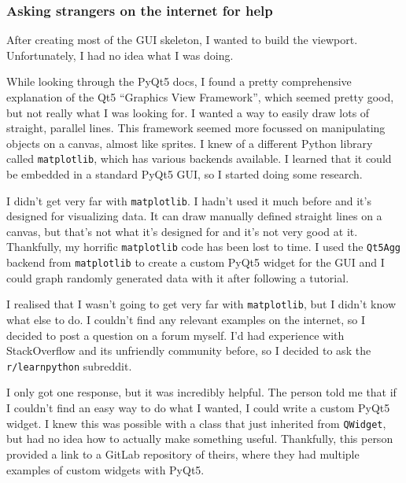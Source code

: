 \documentclass[../development.tex]{subfiles}
\begin{document}
\subsubsection{Asking strangers on the internet for help\label{development:visualizing-matrices:asking-strangers-on-the-internet-for-help}}

After creating most of the GUI skeleton, I wanted to build the viewport. Unfortunately, I had no idea what I was doing.

While looking through the PyQt5 docs, I found a pretty comprehensive explanation of the Qt5 \enquote{Graphics View Framework}\cite{pyqt5-graphics-view-framework}, which seemed pretty good, but not really what I was looking for. I wanted a way to easily draw lots of straight, parallel lines. This framework seemed more focussed on manipulating objects on a canvas, almost like sprites. I knew of a different Python library called \texttt{matplotlib}, which has various backends available. I learned that it could be embedded in a standard PyQt5 GUI, so I started doing some research.

I didn't get very far with \texttt{matplotlib}. I hadn't used it much before and it's designed for visualizing data. It can draw manually defined straight lines on a canvas, but that's not what it's designed for and it's not very good at it. Thankfully, my horrific \texttt{matplotlib} code has been lost to time. I used the \texttt{Qt5Agg} backend from \texttt{matplotlib} to create a custom PyQt5 widget for the GUI and I could graph randomly generated data with it after following a tutorial\cite{matplotlib-pyqt5-tutorial}.

I realised that I wasn't going to get very far with \texttt{matplotlib}, but I didn't know what else to do. I couldn't find any relevant examples on the internet, so I decided to post a question on a forum myself. I'd had experience with StackOverflow and its unfriendly community before, so I decided to ask the \texttt{r/learnpython} subreddit\cite{reddit-framework-question}.

I only got one response, but it was incredibly helpful. The person told me that if I couldn't find an easy way to do what I wanted, I could write a custom PyQt5 widget. I knew this was possible with a class that just inherited from \texttt{QWidget}, but had no idea how to actually make something useful. Thankfully, this person provided a link to a GitLab repository of theirs, where they had multiple examples of custom widgets with PyQt5\cite{gitlab-custom-widgets}.
\end{document}
